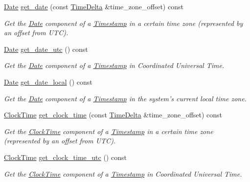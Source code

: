 \begin{DoxyCompactItemize}
\hyperlink{structDate}{Date} \hyperlink{structTimestamp_a8722365a9bad7f0ecf1bc7b9dc61f7a9}{get\-\_\-date} (const \hyperlink{structTimeDelta}{Time\-Delta} \&time\-\_\-zone\-\_\-offset) const 
\begin{DoxyCompactList}\small\item\em Get the \hyperlink{structDate}{Date} component of a \hyperlink{structTimestamp}{Timestamp} in a certain time zone (represented by an offset from U\-T\-C). \end{DoxyCompactList}\item 
\hyperlink{structDate}{Date} \hyperlink{structTimestamp_a4dd9ee5c1ceaad6d4f497487a3e666f5}{get\-\_\-date\-\_\-utc} () const 
\begin{DoxyCompactList}\small\item\em Get the \hyperlink{structDate}{Date} component of a \hyperlink{structTimestamp}{Timestamp} in Coordinated Universal Time. \end{DoxyCompactList}\item 
\hyperlink{structDate}{Date} \hyperlink{structTimestamp_a77a1ae0ca0b09af2adc5f7f49b6c6618}{get\-\_\-date\-\_\-local} () const 
\begin{DoxyCompactList}\small\item\em Get the \hyperlink{structDate}{Date} component of a \hyperlink{structTimestamp}{Timestamp} in the system's current local time zone. \end{DoxyCompactList}\item 
\hyperlink{structClockTime}{Clock\-Time} \hyperlink{structTimestamp_aa826ad33d98e57eb7c76c99481672c32}{get\-\_\-clock\-\_\-time} (const \hyperlink{structTimeDelta}{Time\-Delta} \&time\-\_\-zone\-\_\-offset) const 
\begin{DoxyCompactList}\small\item\em Get the \hyperlink{structClockTime}{Clock\-Time} component of a \hyperlink{structTimestamp}{Timestamp} in a certain time zone (represented by an offset from U\-T\-C). \end{DoxyCompactList}\item 
\hyperlink{structClockTime}{Clock\-Time} \hyperlink{structTimestamp_a0767fd3f69eaa11bb094eb330d9c88ef}{get\-\_\-clock\-\_\-time\-\_\-utc} () const 
\begin{DoxyCompactList}\small\item\em Get the \hyperlink{structClockTime}{Clock\-Time} component of a \hyperlink{structTimestamp}{Timestamp} in Coordinated Universal Time. \end{DoxyCompactList}\item 

\end{DoxyCompactItemize}

